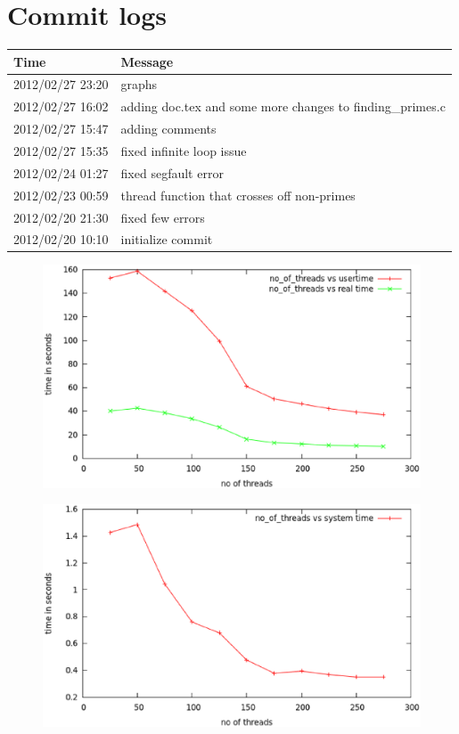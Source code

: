 \documentclass[letterpaper,10pt,twocolumn,titlepage]{article}
\begin{document}
\section{Commit logs}
  \begin{tabular}{ | l | l |}
    \hline
    Time & Message\\ \hline
2012/02/27 23:20 & graphs \\ \hline
2012/02/27 16:02 & adding doc.tex and some more changes to finding\_primes.c \\ \hline
2012/02/27 15:47 & adding comments \\ \hline
2012/02/27 15:35 & fixed infinite loop issue \\ \hline
2012/02/24 01:27 & fixed segfault error \\ \hline
2012/02/23 00:59 & thread function that crosses off non-primes \\ \hline
2012/02/20 21:30 & fixed few errors \\ \hline
2012/02/20 10:10 & initialize commit \\ \hline
  \end{tabular}

\begin{figure}
	\includegraphics[scale=0.5]{graph-1.eps}
\end{figure}
\begin{figure}
	\includegraphics[scale=0.5]{graph-2.eps}
\end{figure}
\end{document}
